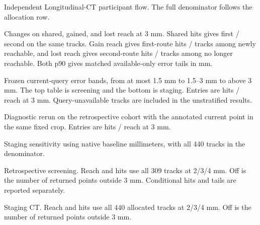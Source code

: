 \begin{table}[!t]
\centering\small
\caption{Independent Longitudinal-CT participant flow. The full denominator follows the allocation row.}
\label{tab:external-flow}

\end{table}

\begin{table}[!t]
\centering\small
\setlength{\tabcolsep}{3pt}
\caption{Changes on shared, gained, and lost reach at 3 mm. Shared hits gives first / second on the same tracks. Gain reach gives first-route hits / tracks among newly reachable, and lost reach gives second-route hits / tracks among no longer reachable. Both p90 gives matched available-only error tails in mm.}
\label{tab:reach-transitions}

\end{table}

\begin{table}[!t]
\centering\small
\caption{Frozen current-query error bands, from at most 1.5 mm to 1.5--3 mm to above 3 mm. The top table is screening and the bottom is staging. Entries are hits / reach at 3 mm. Query-unavailable tracks are included in the unstratified results.}
\label{tab:query-bands}
\par\medskip

\end{table}

\begin{table}[!t]
\centering\small
\caption{Diagnostic rerun on the retrospective cohort with the annotated current point in the same fixed crop. Entries are hits / reach at 3 mm.}

\end{table}

\begin{table}[!t]
\centering\small
\caption{Staging sensitivity using native baseline millimeters, with all 440 tracks in the denominator.}

\end{table}

\begin{table}[!t]
\centering\small
\setlength{\tabcolsep}{4pt}
\caption{Retrospective screening. Reach and hits use all 309 tracks at 2/3/4 mm. Off is the number of returned points outside 3 mm. Conditional hits and tails are reported separately.}
\label{tab:point-luna}

\end{table}

\begin{table}[!t]
\centering\small
\setlength{\tabcolsep}{4pt}
\caption{Staging CT. Reach and hits use all 440 allocated tracks at 2/3/4 mm. Off is the number of returned points outside 3 mm.}
\label{tab:point-external}

\end{table}

